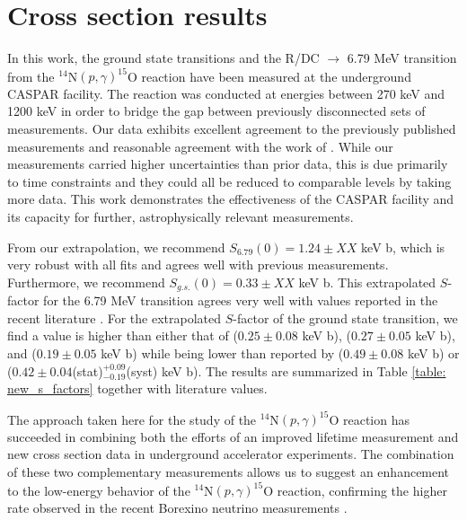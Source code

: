\section{Cross section results}
\label{sec: csResults}

In this work, the ground state transitions and the R/DC $\rightarrow$ 6.79 MeV transition from the $^{14}$N$(p,\gamma)^{15}$O reaction have been measured at the underground CASPAR facility. The reaction was conducted at energies between 270 keV and 1200 keV in order to bridge the gap between previously disconnected sets of measurements. Our data exhibits excellent agreement to the previously published measurements \cite{Formicola2004, Imbriani2005, Runkle2005, Marta2008, Marta2011, Li2016} and reasonable agreement with the work of \cite{Schroder1987, Wagner2018}. While our measurements carried higher uncertainties than prior data, this is due primarily to time constraints and they could all be reduced to comparable levels by taking more data. This work demonstrates the effectiveness of the CASPAR facility and its capacity for further, astrophysically relevant measurements. 

From our extrapolation, we recommend $S_{6.79}(0) = 1.24 \pm XX$ keV b, which is very robust with all fits and agrees well with previous measurements. Furthermore, we recommend $S_{g.s.} (0) = 0.33 \pm XX$ keV b. This extrapolated $S$-factor for the 6.79 MeV transition agrees very well with values reported in the recent literature \cite{Imbriani2005, Adelberger2011, Li2016, Wagner2018}. For the extrapolated $S$-factor of the ground state transition, we find a value is higher than either that of \citet{Imbriani2005} ($0.25 \pm 0.08$ keV b), \citet{Adelberger2011} ($0.27 \pm 0.05$ keV b), and \citet{Wagner2018} ($0.19 \pm 0.05$ keV b) while being lower than reported by \citet{Runkle2005} ($0.49 \pm 0.08$ keV b) or \citet{Li2016} ($0.42 \pm 0.04$(stat)$^{+0.09}_{-0.19}$(syst) keV b). The results are summarized in Table \ref{table: new_s_factors} together with literature values. 


The approach taken here for the study of the $^{14}$N$(p,\gamma)^{15}$O reaction has succeeded in combining both the efforts of an improved lifetime measurement and new cross section data in underground accelerator experiments. The combination of these two complementary measurements allows us to suggest an enhancement to the low-energy behavior of the $^{14}$N$(p,\gamma)^{15}$O reaction, confirming the higher rate observed in the recent Borexino neutrino measurements \cite{agostini2020direct}. 



